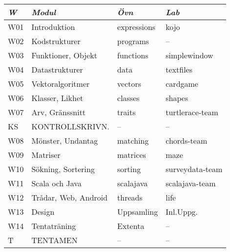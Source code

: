 \begin{tabular}{l|l|l|l}
\textit{W} & \textit{Modul} & \textit{Övn} & \textit{Lab} \\ \hline \hline
W01 & Introduktion         & expressions & kojo            \\
W02 & Kodstrukturer        & programs    & --              \\
W03 & Funktioner, Objekt   & functions   & simplewindow    \\
W04 & Datastrukturer       & data        & textfiles       \\
W05 & Vektoralgoritmer     & vectors     & cardgame        \\
W06 & Klasser, Likhet      & classes     & shapes          \\
W07 & Arv, Gränssnitt      & traits      & turtlerace-team \\
KS  & KONTROLLSKRIVN.      & --          & --              \\
W08 & Mönster, Undantag    & matching    & chords-team     \\
W09 & Matriser             & matrices    & maze            \\
W10 & Sökning, Sortering   & sorting     & surveydata-team \\
W11 & Scala och Java       & scalajava   & scalajava-team  \\
W12 & Trådar, Web, Android & threads     & life            \\
W13 & Design               & Uppsamling  & Inl.Uppg.       \\
W14 & Tentaträning         & Extenta     & --              \\
T   & TENTAMEN             & --          & --              \\
\end{tabular}
